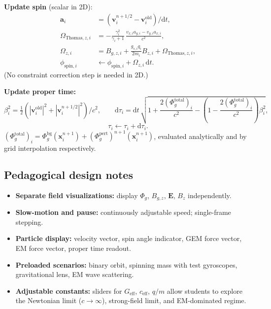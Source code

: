 \documentclass[11pt,a4paper]{article}
\newcommand{\vv}[1]{\mathbf{#1}}
\newcommand{\Phig}{\Phi_g}
\newcommand{\dd}{\mathrm{d}}
\begin{document}
\begin{algsteps}
  \item \textbf{Update spin} (scalar in 2D):
  \begin{align}
    \vv{a}_i &= (\vv{v}_i^{n+1/2} - \vv{v}_i^{\mathrm{old}})/\dd t, \\
    \Omega_{\mathrm{Thomas},z,i} &= -\frac{\gamma_i^2}{\gamma_i+1}\,\frac{v_{x,i}a_{y,i} - v_{y,i}a_{x,i}}{c^2}, \\
    \Omega_{z,i} &= B_{g,z,i} + \frac{g_{s,i}q_i}{2m_i}B_{z,i} + \Omega_{\mathrm{Thomas},z,i}, \\
    \phi_{\mathrm{spin},i} &\leftarrow \phi_{\mathrm{spin},i} + \Omega_{z,i}\,\dd t.
  \end{align}
  (No constraint correction step is needed in 2D.)

  \item \textbf{Update proper time:}
  \begin{equation}
    \beta_i^2 = \tfrac{1}{2}\!\left(|\vv{v}_i^{\mathrm{old}}|^2 + |\vv{v}_i^{n+1/2}|^2\right)/c^2, \qquad
    \dd\tau_i = \dd t\,\sqrt{1 + \frac{2(\Phig^{\mathrm{total}})_i}{c^2}
                             - \left(1-\frac{2(\Phig^{\mathrm{total}})_i}{c^2}\right)\beta_i^2},
  \end{equation}
  \begin{equation}
    \tau_i \leftarrow \tau_i + \dd\tau_i.
  \end{equation}
  $(\Phig^{\mathrm{total}})_i = \Phig^{\mathrm{bg}}(\vv{x}_i^{n+1}) + (\Phig^{\mathrm{pert}})^{n+1}(\vv{x}_i^{n+1})$, evaluated analytically and by grid interpolation respectively.
\end{algsteps}

\subsection{Pedagogical design notes}

\begin{itemize}
  \item \textbf{Separate field visualizations:} display $\Phig$, $B_{g,z}$, $\vv{E}$, $B_z$ independently.
  \item \textbf{Slow-motion and pause:} continuously adjustable speed; single-frame stepping.
  \item \textbf{Particle display:} velocity vector, spin angle indicator, GEM force vector, EM force vector, proper time readout.
  \item \textbf{Preloaded scenarios:} binary orbit, spinning mass with test gyroscopes, gravitational lens, EM wave scattering.
  \item \textbf{Adjustable constants:} sliders for $G_{\mathrm{eff}}$, $c_{\mathrm{eff}}$, $q/m$ allow students to explore the Newtonian limit ($c\to\infty$), strong-field limit, and EM-dominated regime.
\end{itemize}
\end{document}
